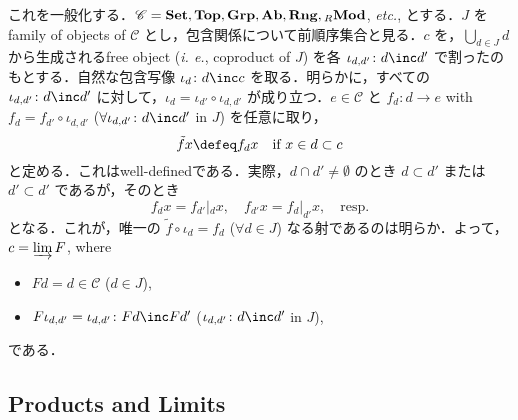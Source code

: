 \documentclass{naughieLuatex}
\newcommand\cat\mathscr
\newcommand\ext\tilde
\newcommand\thatis{\emph{i. e.}}
\newcommand\etcetra{\emph{etc.}}
\newcommand\catb\mathbf
\newcommand\dLim\varinjlim
\newcommand\Set{\catb{Set}}
\newcommand\Grp{\catb{Grp}}
\newcommand\Mod{\catb{Mod}}
\newcommand\lMod[1][R]{\vphantom{\Mod}_{#1} \Mod}
\newcommand\Tops{\catb{Top}}
\newcommand\Ab{\catb{Ab}}
\newcommand\Rng{\catb{Rng}}
\begin{document}
\begin{enumerate}[label=(\arabic*)]
    これを一般化する．$\cat C = \Set, \Tops, \Grp, \Ab, \Rng, \lMod$, \etcetra, とする．$J$ をfamily of objects of $\cat C$ とし，包含関係について前順序集合と見る．$c$ を，$\bigcup_{d \in J} d$ から生成されるfree object (\thatis, coproduct of $J$) を各 $\iota_{d, d'} \colon d \inc d'$ で割ったのもとする．自然な包含写像 $\iota_d \colon d \inc c$ を取る．明らかに，すべての $\iota_{d, d'} \colon d \inc d'$ に対して，$\iota_d = \iota_{d'} \circ \iota_{d, d'}$ が成り立つ．$e \in \cat C$ と $f_d \colon d \to e$ with $f_d = f_{d'} \circ \iota_{d, d'}$ ($\forall \iota_{d, d'} \colon d \inc d'$ in $J$) を任意に取り，
    \[
      \ext f x \defeq f_d x \quad \text{if} \ x \in d \subset c
    \]
    と定める．これはwell-definedである．実際，$d \cap d' \neq \emptyset$ のとき $d \subset d'$ または $d' \subset d'$ であるが，そのとき
    \[
      f_d x = f_{d'} |_d x, \quad f_{d'} x = f_d |_{d'} x, \quad \text{resp.}
    \]
    となる．これが，唯一の $\ext f \circ \iota_d = f_d$ ($\forall d \in J$) なる射であるのは明らか．よって，$c = \dLim F$, where
    \begin{itemize}
      \item $F d = d \in \cat C$ ($d \in J$),
      \item $F \iota_{d, d'} = \iota_{d, d'} \colon F d \inc F d'$ ($\iota_{d, d'} \colon d \inc d'$ in $J$),
    \end{itemize}
    である．
\end{enumerate}

\subsection{Products and Limits}
\end{document}
